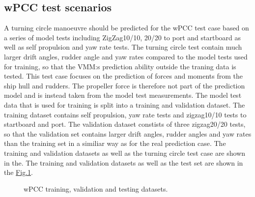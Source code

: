 \documentclass[review]{elsarticle}
\begin{document}
\subsection{wPCC test scenarios}
\label{\detokenize{05.01_case_studies:wpcc-test-scenarios}}
\sphinxAtStartPar
A turning circle manoeuvre should be predicted for the wPCC test case based on a series of model tests including ZigZag10/10, 20/20 to port and startboard as well as self propulsion and yaw rate tests. The turning circle test contain much larger drift angles, rudder angle and yaw rates compared to the model tests used for training, so that the VMM:s prediction ability outside the traning data is tested.
This test case focuses on the prediction of forces and moments from the ship hull and rudders. The propeller force is therefore not part of the prediction model and is instead taken from the model test measurements.
The model test data that is used for training is split into a training and validation dataset. The training dataset contains self propulsion, yaw rate tests and zigzag10/10 tests to startboard and port. The validation dataset constists of three zigzag20/20 tests, so that the validation set contains larger drift angles, rudder angles and yaw rates than the training set in a similiar way as for the real prediction case. The training and validation datasets as well as the turning circle test case are shown in the. The training and validation datasets as well as the test set are shown in the \hyperref[\detokenize{05.01_case_studies:fig-traintest}]{Fig.\@ \ref{\detokenize{05.01_case_studies:fig-traintest}}}.

\begin{figure}[H]
\centering
\capstart

\noindent{}
\caption{wPCC training, validation and testing datasets.}\label{\detokenize{05.01_case_studies:fig-traintest}}\end{figure}
\end{document}
